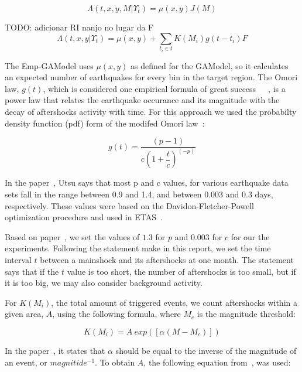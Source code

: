 \begin{equation}\label{reducedgamodel}
	\Lambda(t,x,y,M|\Upsilon_t) = \mu(x,y)J(M)
\end{equation}

TODO: adicionar RI nanjo no lugar da F
\begin{equation}\label{emp-model}
 \Lambda(t,x,y|\Upsilon_t) = \mu(x,y) + \displaystyle\sum_{t_i \in t} K(M_i)g(t-t_i)F
\end{equation}

The Emp-GAModel uses $\mu(x,y)$ as defined for the GAModel, so it
calculates an expected number of earthquakes for every bin in the
target region. The Omori law, $g(t)$, which is considered one
empirical formula of great
success~\cite{zhuang2004analyzing}~\cite{utsu1995centenary}~\cite{omori1895after},
is a power law that relates the earthquake occurance and its magnitude
with the decay of aftershocks activity with time. For this approach we
used the probabilty density function (pdf) form of the modifed Omori
law~\cite{zhuang2004analyzing}:

\begin{equation}\label{omori}
	g(t)= \dfrac{(p-1)}{c(1+ \dfrac{t}{c})^(-p)}
\end{equation}

In the paper~\cite{utsu1995centenary}, Utsu says that most p and c
values, for various earthquake data sets fall in the range between 0.9
and 1.4, and between 0.003 and 0.3 days, respectively. These values
were based on the Davidon-Fletcher-Powell optimization procedure and
used in ETAS~\cite{utsu1995centenary}.

Based on paper~\cite{yamanaka1990scaling}, we set the values of $1.3$
for $p$ and $0.003$ for $c$ for our the experiments. Following the
statement make in this report, we set the time interval $t$ between a
mainshock and its aftershocks at one month. The statement says that if
the $t$ value is too short, the number of aftershocks is too small,
but if it is too big, we may also consider background activity.

For $K(M_i)$, the total amount of triggered events, we count
aftershocks within a given area, $A$, using the following formula,
where $M_c$ is the magnitude threshold:

\begin{equation}\label{triggered}
 K(M_i) = A\ exp([\alpha(M-M_c)])
\end{equation}

In the paper~\cite{ogata2006space}, it states that $\alpha$ should be
equal to the inverse of the magnitude of an event, or
$magnitide^{-1}$. To obtain $A$, the following equation
from~\cite{yamanaka1990scaling}, was used:

